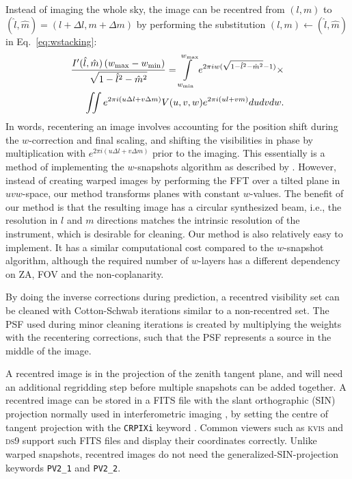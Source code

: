 \documentclass[useAMS,usenatbib]{mn2e}
\begin{document}
Instead of imaging the whole sky, the image can be recentred from $(l,m)$ to $(\hat{l},\hat{m})=(l+\Delta l,m+\Delta m)$ by performing the substitution $(l,m)\leftarrow(\hat{l},\hat{m})$ in Eq.~\eqref{eq:wstacking}:
\begin{align}\notag
\frac{I'(\hat{l}, \hat{m})\left(w_{\max} - w_{\min}\right)}{\sqrt{1-\hat{l}^2-\hat{m}^2}} = \int\limits_{w_{\min}}^{w_{\max}} e^{2\pi i w(\sqrt{1-\hat{l}^2-\hat{m}^2}-1)} \times \\
\iint e^{2 \pi i \left(u\Delta l + v\Delta m\right)} V(u,v,w) e^{2\pi i \left(ul + vm\right)} du dv dw.
\end{align}
In words, recentering an image involves accounting for the position shift during the $w$-correction and final scaling, and shifting the visibilities in phase by multiplication with $e^{2 \pi i \left(u\Delta l + v\Delta m\right)}$ prior to the imaging. This essentially is a method of implementing the $w$-snapshots algorithm as described by \citet{widefield-imaging-ska-cornwell}. However, instead of creating warped images by performing the FFT over a tilted plane in $uvw$-space, our method transforms planes with constant $w$-values. The benefit of our method is that the resulting image has a circular synthesized beam, i.e., the resolution in $l$ and $m$ directions matches the intrinsic resolution of the instrument, which is desirable for cleaning. Our method is also relatively easy to implement. It has a similar computational cost compared to the $w$-snapshot algorithm, although the required number of $w$-layers has a different dependency on ZA, FOV and the non-coplanarity.

By doing the inverse corrections during prediction, a recentred visibility set can be cleaned with Cotton-Schwab iterations similar to a non-recentred set. The PSF used during minor cleaning iterations is created by multiplying the weights with the recentering corrections, such that the PSF represents a source in the middle of the image.

A recentred image is in the projection of the zenith tangent plane, and will need an additional regridding step before multiple snapshots can be added together. A recentred image can be stored in a FITS file with the slant orthographic (SIN) projection normally used in interferometric imaging \citep{fits-coordinates-2002}, by setting the centre of tangent projection with the \texttt{CRPIXi} keyword \citep{wcs-in-fits}. Common viewers such as \textsc{kvis} \citep{karma-1996} and \textsc{ds9} support such FITS files and display their coordinates correctly. Unlike warped snapshots, recentred images do not need the generalized-SIN-projection keywords \texttt{PV2\_1} and \texttt{PV2\_2}.
\end{document}
